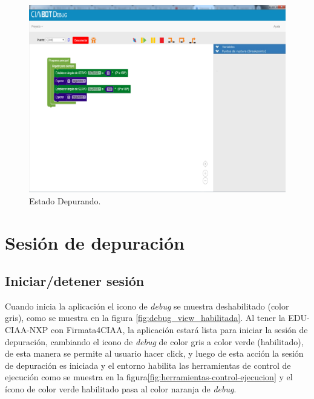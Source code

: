 \begin{figure}[!htbp]
	\begin{center}  %
		\includegraphics[width=15cm]{./Figures/debug-debug.png}
		\par\caption{Estado Depurando.}\label{fig:debug}
	\end{center}
\end{figure}


\section{Sesión de depuración}
\label{sec:Sesión de depuración}

\subsection{Iniciar/detener sesión}
\label{subsec:Iniciar/detener sesión}

Cuando inicia la aplicación el icono de \emph{debug} se muestra deshabilitado (color gris), como se muestra en la figura \ref{fig:debug_view_habilitada}.
Al tener la EDU-CIAA-NXP con Firmata4CIAA, la aplicación estará lista para iniciar la sesión de depuración, cambiando el icono de \emph{debug} de color gris a color verde (habilitado), de esta manera se  permite al usuario hacer click, y luego de esta acción la sesión de depuración es iniciada y el entorno habilita las herramientas de control de ejecución como se muestra en la figura\ref{fig:herramientas-control-ejecucion} y el ícono de color verde habilitado pasa al color naranja de \emph{debug}.

